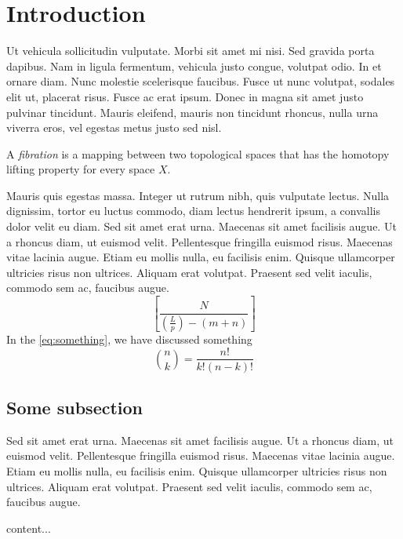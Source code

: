 \section{Introduction}

Ut vehicula sollicitudin vulputate. Morbi sit amet mi nisi. Sed gravida porta dapibus. Nam in ligula fermentum, vehicula justo congue, volutpat odio. In et ornare diam. Nunc molestie scelerisque faucibus. Fusce ut nunc volutpat, sodales elit ut, placerat risus. Fusce ac erat ipsum. Donec in magna sit amet justo pulvinar tincidunt. Mauris eleifend, mauris non tincidunt rhoncus, nulla urna viverra eros, vel egestas metus justo sed nisl.

\begin{definition}[Fibration]
A \emph{fibration} is a mapping between two topological spaces that has the homotopy lifting property for every space $X$.\end{definition}

Mauris quis egestas massa. Integer ut rutrum nibh, quis vulputate lectus. Nulla dignissim, tortor eu luctus commodo, diam lectus hendrerit ipsum, a convallis dolor velit eu diam. Sed sit amet erat urna. Maecenas sit amet facilisis augue. Ut a rhoncus diam, ut euismod velit. Pellentesque fringilla euismod risus. Maecenas vitae lacinia augue. Etiam eu mollis nulla, eu facilisis enim. Quisque ullamcorper ultricies risus non ultrices. Aliquam erat volutpat. Praesent sed velit iaculis, commodo sem ac, faucibus augue.
\begin{equation}\label{eq:something}
\left[  \frac{ N } { \left( \frac{L}{p} \right)  - (m+n) }  \right]
\end{equation}
In the \autoref{eq:something}, we have discussed something
\begin{equation}
\binom{n}{k} = \frac{n!}{k!(n-k)!}
\end{equation}

\subsection{Some subsection}
 Sed sit amet erat urna. Maecenas sit amet facilisis augue. Ut a rhoncus diam, ut euismod velit. Pellentesque fringilla euismod risus. Maecenas vitae lacinia augue. Etiam eu mollis nulla, eu facilisis enim. Quisque ullamcorper ultricies risus non ultrices. Aliquam erat volutpat. Praesent sed velit iaculis, commodo sem ac, faucibus augue.
 \begin{theorem}[]
 	content...
 \end{theorem}

